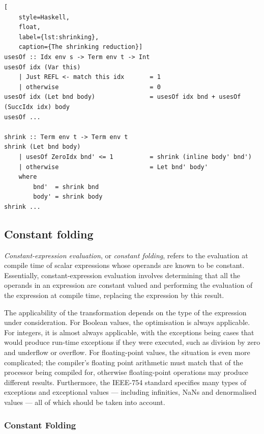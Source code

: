 \begin{lstlisting}[
    style=Haskell,
    float,
    label={lst:shrinking},
    caption={The shrinking reduction}]
usesOf :: Idx env s -> Term env t -> Int
usesOf idx (Var this)
    | Just REFL <- match this idx       = 1
    | otherwise                         = 0
usesOf idx (Let bnd body)               = usesOf idx bnd + usesOf (SuccIdx idx) body
usesOf ...

shrink :: Term env t -> Term env t
shrink (Let bnd body)
    | usesOf ZeroIdx bnd' <= 1          = shrink (inline body' bnd')
    | otherwise                         = Let bnd' body'
    where
        bnd'  = shrink bnd
        body' = shrink body
shrink ...
\end{lstlisting}


\subsection{Constant folding}
\label{sec:constant_folding}

\emph{Constant-expression evaluation}, or \emph{constant folding}, refers to the
evaluation at compile time of scalar expressions whose operands are known to be
constant. Essentially, constant-expression evaluation involves determining that
all the operands in an expression are constant valued and performing the
evaluation of the expression at compile time, replacing the expression by this
result.

The applicability of the transformation depends on the type of the expression
under consideration. For Boolean values, the optimisation is always applicable.
For integers, it is almost always applicable, with the exceptions being cases
that would produce run-time exceptions if they were executed, such as division
by zero and underflow or overflow. For floating-point values, the situation is
even more complicated; the compiler's floating point arithmetic must match that
of the processor being compiled for, otherwise floating-point operations may
produce different results. Furthermore, the IEEE-754 standard specifies many
types of exceptions and exceptional values --- including infinities, NaNs and
denormalised values --- all of which should be taken into account.


\subsubsection{Constant Folding}

